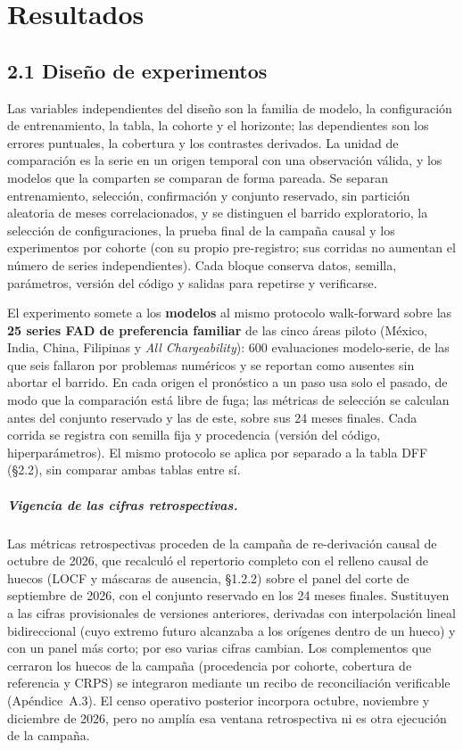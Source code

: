 \documentclass[12pt,letterpaper]{report}
\begin{document}
\chapter{Resultados}

\section{2.1 Diseño de experimentos}

Las variables independientes del diseño son la familia de modelo, la configuración
de entrenamiento, la tabla, la cohorte y el horizonte; las dependientes son los errores
puntuales, la cobertura y los contrastes derivados. La unidad de comparación es la serie en un
origen temporal con una observación válida, y los modelos que la comparten se comparan de forma
pareada. Se separan entrenamiento, selección, confirmación y conjunto reservado, sin partición
aleatoria de meses correlacionados, y se distinguen el barrido exploratorio, la selección de
configuraciones, la prueba final de la campaña causal y los experimentos por cohorte (con su
propio pre-registro; sus corridas no aumentan el número de series independientes). Cada bloque
conserva datos, semilla, parámetros, versión del código y salidas para repetirse y verificarse.

El experimento somete a los \textbf{\factNModels{} modelos} al mismo protocolo walk-forward
sobre las \textbf{25 series FAD de preferencia familiar} de las cinco áreas piloto (México,
India, China, Filipinas y \textit{All Chargeability}): 600 evaluaciones modelo-serie, de las que
seis fallaron por problemas numéricos y se reportan como ausentes sin abortar el barrido. En
cada origen el pronóstico a un paso usa solo el pasado, de modo que la comparación está libre de
fuga; las métricas de selección se calculan antes del conjunto reservado y las de este, sobre
sus 24 meses finales. Cada corrida se registra con semilla fija y procedencia (versión del
código, hiperparámetros). El mismo protocolo se aplica por separado a la tabla DFF (§2.2), sin
comparar ambas tablas entre sí.

\paragraph{Vigencia de las cifras retrospectivas.} Las métricas retrospectivas proceden de
la campaña de re-derivación causal de octubre de 2026, que recalculó el repertorio completo con
el relleno causal de huecos (LOCF y máscaras de ausencia, §1.2.2) sobre el panel del corte de
septiembre de 2026, con el conjunto reservado en los 24 meses finales. Sustituyen a las cifras
provisionales de versiones anteriores, derivadas con interpolación lineal bidireccional (cuyo
extremo futuro alcanzaba a los orígenes dentro de un hueco) y con un panel más corto; por eso
varias cifras cambian. Los complementos que cerraron los huecos de la campaña (procedencia por
cohorte, cobertura de referencia y CRPS) se integraron mediante un recibo de reconciliación
verificable (Apéndice~A.3). El censo operativo posterior incorpora octubre, noviembre y diciembre de 2026,
pero no amplía esa ventana retrospectiva ni es otra ejecución de la campaña.
\end{document}

